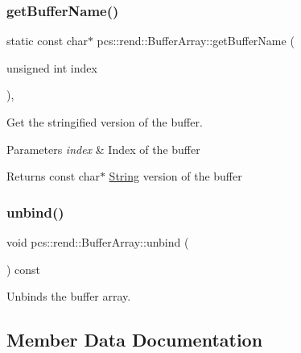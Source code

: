 \subsubsection{\texorpdfstring{get\+Buffer\+Name()}{getBufferName()}}
{\footnotesize\ttfamily static const char$\ast$ pcs\+::rend\+::\+Buffer\+Array\+::get\+Buffer\+Name (\begin{DoxyParamCaption}\item[{unsigned int}]{index }\end{DoxyParamCaption})\hspace{0.3cm}{\ttfamily [inline]}, {\ttfamily [static]}}



Get the stringified version of the buffer. 


\begin{DoxyParams}{Parameters}
{\em index} & Index of the buffer \\
\hline
\end{DoxyParams}
\begin{DoxyReturn}{Returns}
const char$\ast$ \hyperlink{classpcs_1_1String}{String} version of the buffer 
\end{DoxyReturn}
\mbox{\label{classpcs_1_1rend_1_1BufferArray_a8c00f92e0911c209b26cf99fa2920d95}} 
\subsubsection{\texorpdfstring{unbind()}{unbind()}}
{\footnotesize\ttfamily void pcs\+::rend\+::\+Buffer\+Array\+::unbind (\begin{DoxyParamCaption}{ }\end{DoxyParamCaption}) const\hspace{0.3cm}{\ttfamily [inline]}}



Unbinds the buffer array. 



\subsection{Member Data Documentation}
\mbox{\label{classpcs_1_1rend_1_1BufferArray_a9e2281d3dab3361dd8b9aca55c53e4a7}} 
